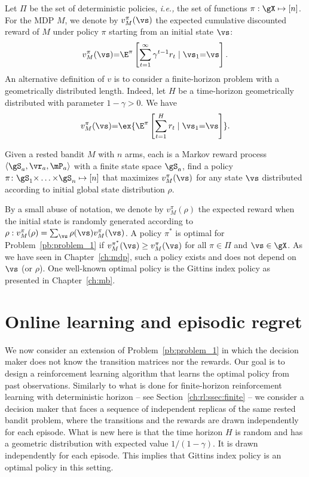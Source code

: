 Let $\Pi$ be the set of deterministic policies, \emph{i.e.,} the set of
functions $\pi:\gX\mapsto[n]$. For the MDP $M$, we denote by
$v_{M}^{\pi}(\vs)$ the expected cumulative discounted reward of ${M}$ under policy $\pi$ starting from an initial state $\vs$:
\[v_{M}^\pi(\vs) {=}
\E^\pi\left[\sum_{t=1}^{\infty} \gamma^{t-1}r_t \mid \vs_1{=}\vs\right].\]
An alternative definition of $v$ is to consider a finite-horizon problem with a geometrically distributed length. Indeed, let $H$ be a time-horizon geometrically distributed with parameter $1-\gamma>0$. We have
\begin{equation}
    \label{eq:V-vs_R}
    v_{M}^\pi(\vs)  {=} \ex{\E^\pi\left[\sum_{t=1}^{H} r_t \mid \vs_1{=}\vs\right]}.
\end{equation}
\begin{prob}
\label{pb:problem_1}
Given a rested bandit $M$ with $n$ arms, each is a Markov reward process $\langle\gS_a,\vr_a,\mP_a\rangle$ with a finite state space $\gS_a$, find a policy $\pi\colon\gS_1{\times}\dots{\times}\gS_n\mapsto[n]$ that maximizes $v_{M}^\pi(\vs)$ for any state $\vs$ distributed according to initial global state distribution $\rho$.
\end{prob}

By a small abuse of notation, we denote by $v_M^\pi(\rho)$ the expected reward when the initial state is randomly generated according to $\rho: v_M^\pi(\rho)=\sum_{\vs}\rho(\vs)v_{M}^\pi(\vs)$.
A policy
$\pi^*$ is optimal for Problem~\ref{pb:problem_1} if $ v_{M}^{\pi^*}(\vs) \ge v_{M}^\pi(\vs) $ for all
$\pi\in\Pi$ and $\vs\in\gX$.
As we have seen in Chapter~\ref{ch:mdp},
such a policy exists and does not depend on $\vs$ (or $\rho$). One well-known optimal policy is the Gittins index policy as presented in Chapter~\ref{ch:mb}. 


\section{Online learning and episodic regret}
\label{ch:rested:sec:problem}

We now consider an extension of Problem~\ref{pb:problem_1} in which the decision maker does not know the transition matrices
nor the rewards. Our goal is to design a reinforcement learning algorithm that
learns the optimal policy from past observations.  Similarly to what is done
for finite-horizon reinforcement learning with deterministic horizon -- see
Section~\ref{ch:rl:ssec:finite} --
we consider a decision maker that faces a sequence of independent replicas of
the same rested bandit problem, where the transitions and the rewards 
are drawn independently for each episode.
What is new here is that the time horizon $H$ is random and has a geometric distribution with expected value $1/(1-\gamma)$. It is drawn  independently for each episode. This implies that Gittins index policy is an optimal policy in this setting. %

